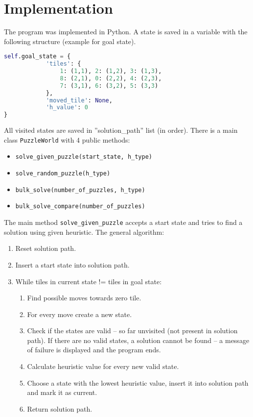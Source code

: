 \documentclass{article}
\begin{document}
\section{Implementation}
The program was implemented in Python. A state is saved in a variable with the following structure (example for goal state).
\begin{lstlisting}[language=python]
self.goal_state = {
            'tiles': {
                1: (1,1), 2: (1,2), 3: (1,3),
                8: (2,1), 0: (2,2), 4: (2,3),
                7: (3,1), 6: (3,2), 5: (3,3)
            },
            'moved_tile': None,
            'h_value': 0
}
\end{lstlisting}
All visited states are saved in ''solution\_path'' list (in order). There is a main class \texttt{PuzzleWorld} with 4 public methods: 
\begin{itemize}
\item \verb|solve_given_puzzle(start_state, h_type)|
\item \verb|solve_random_puzzle(h_type)|
\item \verb|bulk_solve(number_of_puzzles, h_type)|
\item \verb|bulk_solve_compare(number_of_puzzles)|
\end{itemize}

The main method \verb|solve_given_puzzle| accepts a start state and tries to find a solution using given heuristic. The general algorithm:
\begin{enumerate}
\item Reset solution path.
\item Insert a start state into solution path.
\item While tiles in current state != tiles in goal state:
	\begin{enumerate}
	\item Find possible moves towards zero tile.
           \item For every move create a new state.
           \item Check if the states are valid -- so far unvisited (not present in solution path). If there are no valid states, a solution cannot be found -- a message of failure is displayed and the program ends.
           \item Calculate heuristic value for every new valid state.
           \item Choose a state with the lowest heuristic value, insert it into solution path and mark it as current.
           \item Return solution path.
	\end{enumerate}
\end{enumerate}
\end{document}
